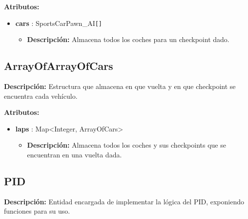 \bigskip

\textbf{Atributos: }
\begin{itemize}
    \item \textbf{cars} : SportsCarPawn\_AI\verb|[]|
    \begin{itemize}
        \item \textbf{Descripción: }Almacena todos los coches para un checkpoint dado.
    \end{itemize}
\end{itemize}

\subsection{ArrayOfArrayOfCars}
\textbf{Descripción: }Estructura que almacena en que vuelta y en que checkpoint se encuentra cada vehículo.

\bigskip

\textbf{Atributos: }
\begin{itemize}
    \item \textbf{laps} : Map<Integer, ArrayOfCars>
    \begin{itemize}
        \item \textbf{Descripción: }Almacena todos los coches y sus checkpoints que se encuentran en una vuelta dada.
    \end{itemize}
\end{itemize}


\subsection{PID}
\textbf{Descripción: }Entidad encargada de implementar la lógica del PID, exponiendo funciones para su uso.

\bigskip

